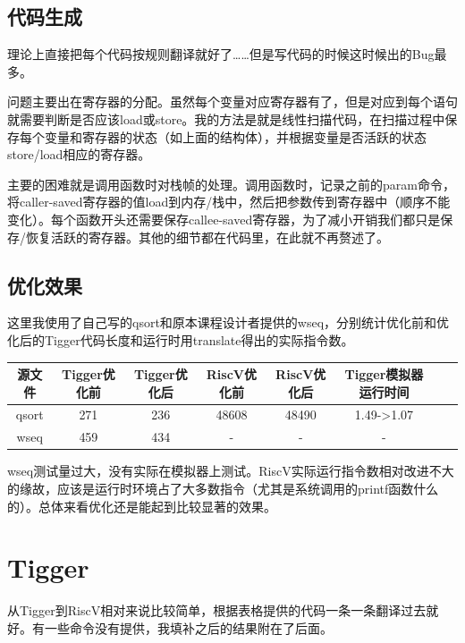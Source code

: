 \documentclass{ctexart}
\begin{document}
\subsection{代码生成}
理论上直接把每个代码按规则翻译就好了……但是写代码的时候这时候出的Bug最多。

问题主要出在寄存器的分配。虽然每个变量对应寄存器有了，但是对应到每个语句就需要判断是否应该load或store。我的方法是就是线性扫描代码，在扫描过程中保存每个变量和寄存器的状态（如上面的结构体），并根据变量是否活跃的状态store/load相应的寄存器。

主要的困难就是调用函数时对栈帧的处理。调用函数时，记录之前的param命令，将caller-saved寄存器的值load到内存/栈中，然后把参数传到寄存器中（顺序不能变化）。每个函数开头还需要保存callee-saved寄存器，为了减小开销我们都只是保存/恢复活跃的寄存器。其他的细节都在代码里，在此就不再赘述了。

\subsection{优化效果}
这里我使用了自己写的qsort和原本课程设计者提供的wseq，分别统计优化前和优化后的Tigger代码长度和运行时用translate得出的实际指令数。

\begin{center}
  \begin{tabular}{cccccccc}
  \hline
  源文件& Tigger优化前& Tigger优化后& RiscV优化前& RiscV优化后& Tigger模拟器运行时间\\
  \hline
  qsort& 271& 236& 48608& 48490& 1.49->1.07\\
  wseq& 459& 434& -& -& -\\
  \hline
  \end{tabular}
\end{center}


wseq测试量过大，没有实际在模拟器上测试。RiscV实际运行指令数相对改进不大的缘故，应该是运行时环境占了大多数指令（尤其是系统调用的printf函数什么的）。总体来看优化还是能起到比较显著的效果。
\section{Tigger}

从Tigger到RiscV相对来说比较简单，根据表格提供的代码一条一条翻译过去就好。有一些命令没有提供，我填补之后的结果附在了后面。
\end{document}
